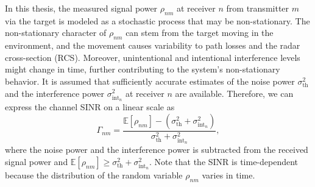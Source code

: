 \documentclass[english, 12pt, a4paper, elec, utf8, a-1b, online]{aaltothesis}
\newcommand{\E}[1]{\mathbb{E}\left[ #1 \right]}
\newcommand{\thnoise}{\sigma^2_{\text{th}}}
\newcommand{\eintnoise}{\sigma^2_{\text{int}_{n}}}
\newcommand{\esinrexp}{\Gamma_{nm}}
\newcommand{\esp}{\rho_{nm}}
\begin{document}
In this thesis, the measured signal power $\esp$ at receiver $n$ from transmitter $m$ via the target is modeled as a stochastic process that may be non-stationary. 
The non-stationary character of $\esp$ can stem from the target moving in the environment, and 
the movement causes variability to path losses and the radar cross-section (RCS).
Moreover, unintentional and intentional interference levels might change in time, further contributing to the system's non-stationary behavior.
It is assumed that sufficiently accurate estimates of the noise power $\thnoise$ and the interference power $\eintnoise$ at receiver $n$ are available.
Therefore, we can express the channel SINR on a linear scale as
\begin{equation}\label{eq:sinr}
     \esinrexp = \frac{\E{\esp} - (\thnoise + \eintnoise)}{\thnoise + \eintnoise },
\end{equation}
where the noise power and the interference power is subtracted from the received signal power and $\E{\esp} \geq \thnoise + \eintnoise$.
Note that the SINR is time-dependent because the distribution of the random variable $\esp$ varies in time. 
\end{document}
